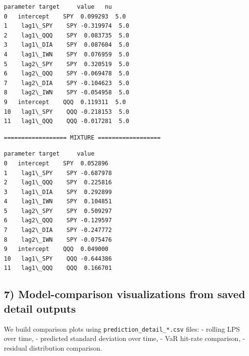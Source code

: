 \documentclass[11pt]{article}
\begin{document}
    
    \begin{Verbatim}[commandchars=\\\{\}]
    parameter target     value   nu
0   intercept    SPY  0.099293  5.0
1    lag1\_SPY    SPY -0.319974  5.0
2    lag1\_QQQ    SPY  0.083735  5.0
3    lag1\_DIA    SPY  0.087604  5.0
4    lag1\_IWN    SPY  0.076959  5.0
5    lag2\_SPY    SPY  0.320519  5.0
6    lag2\_QQQ    SPY -0.069478  5.0
7    lag2\_DIA    SPY -0.104623  5.0
8    lag2\_IWN    SPY -0.054958  5.0
9   intercept    QQQ  0.119311  5.0
10   lag1\_SPY    QQQ -0.218153  5.0
11   lag1\_QQQ    QQQ -0.017281  5.0
    \end{Verbatim}

    
    \begin{Verbatim}[commandchars=\\\{\}]
 ================== MIXTURE ==================
    \end{Verbatim}

    
    \begin{Verbatim}[commandchars=\\\{\}]
    parameter target     value
0   intercept    SPY  0.052896
1    lag1\_SPY    SPY -0.687978
2    lag1\_QQQ    SPY  0.225816
3    lag1\_DIA    SPY  0.292899
4    lag1\_IWN    SPY  0.104851
5    lag2\_SPY    SPY  0.509297
6    lag2\_QQQ    SPY -0.129597
7    lag2\_DIA    SPY -0.247772
8    lag2\_IWN    SPY -0.075476
9   intercept    QQQ  0.049000
10   lag1\_SPY    QQQ -0.644386
11   lag1\_QQQ    QQQ  0.166701
    \end{Verbatim}

    
    \subsection{7) Model-comparison visualizations from saved detail
outputs}\label{model-comparison-visualizations-from-saved-detail-outputs}

We build comparison plots using \texttt{prediction\_detail\_*.csv}
files: - rolling LPS over time, - predicted standard deviation over
time, - VaR hit-rate comparison, - residual distribution comparison.
\end{document}
